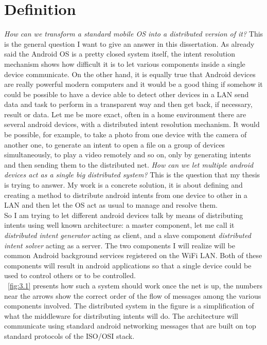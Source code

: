 \section{Definition} \label{problemdefinition}
\textit{How can we transform a standard mobile OS into a distributed version of it?} This is the general question I want to give an answer in this dissertation.
As already said the Android OS is a pretty closed system itself, the intent resolution mechanism shows how difficult it is to let various components inside a single device communicate. On the other hand, it is equally true that Android devices are really powerful modern computers and it would be a good thing if somehow it could be possible to have a device able to detect other devices in a LAN send data and task to perform in a transparent way and then get back, if necessary, result or data. Let me be more exact, often in a home environment there are several android devices, with a distributed intent resolution mechanism. It would be possible, for example, to take a photo from one device with the camera of another one, to generate an intent to open a file on a group of devices simultaneously, to play a video remotely and so on, only by generating intents and then sending them to the distributed net. \textit{How can we let multiple android devices act as a single big distributed system?} This is the question that my thesis is trying to answer. My work is a concrete solution, it is about defining and creating a method to distribute android intents from one device to other in a LAN and then let the OS act as usual to manage and resolve them.\\
So I am trying to let different android devices talk by means of distributing intents using  well known architecture: a master component, let me call it \textit{distributed intent generator} acting as client, and a slave component \textit{distributed intent solver} acting as a server. The two components I will realize will be common Android background services registered on the WiFi LAN. Both of these components will result in android applications so that a single device could be used to control others or to be controlled.\\
\figurename~\ref{fig:3.1} presents how such a system should work once the net is up, the numbers near the arrows show the correct order of the flow of messages among the various components involved. The distributed system in the figure is a simplification of what the middleware for distributing intents will do. The architecture will communicate using standard android networking messages that are built on top standard protocols of the ISO/OSI stack.
 
